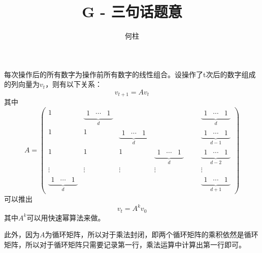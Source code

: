 \documentclass[a4paper]{ctexart}
\title{G - 三句话题意}
\author{何柱}
\newcommand{\block}[1]{
		\underbrace{\begin{matrix}1 & \cdots & 1\end{matrix}}_{#1}
	}
\begin{document}
	\maketitle
	每次操作后的所有数字为操作前所有数字的线性组合。设操作了t次后的数字组成的列向量为$v_t$，则有以下关系：
	$$v_{t+1}=Av_t$$
	其中
	$$A=\begin{pmatrix}
		1 & \block{d} &&&&& \block{d} \\
		1 & 1 & \block{d} &&&& \block{d - 1} \\
		1 & 1 & 1 & \block{d} &&& \block{d - 2} \\
		\vdots & \vdots & \vdots & \vdots &&& \vdots \\
		\block{d} &&&&&& \block{d + 1}
	\end{pmatrix}$$
	可以推出
	$$v_{t}=A^kv_0$$
	其中$A^k$可以用快速幂算法来做。

	此外，因为$A$为循环矩阵，所以对于乘法封闭，即两个循环矩阵的乘积依然是循环矩阵，所以对于循环矩阵只需要记录第一行，乘法运算中计算出第一行即可。
\end{document}
